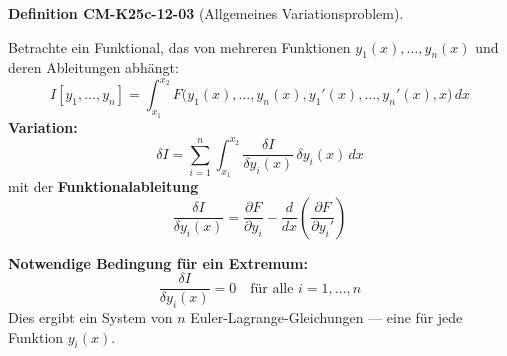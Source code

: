 \documentclass[10pt, letterpaper]{article}
\newcommand{\CustomHeading}[3]{%
  \par\medskip\noindent%
  \textbf{#1 #2} \textnormal{(#3)}.\enskip%
}
\newenvironment{DEF}[2]{\CustomHeading{Definition}{#1}{#2}}{}
\begin{document}
\begin{DEF}{CM-K25c-12-03}{Allgemeines Variationsproblem}
Betrachte ein Funktional, das von mehreren Funktionen \( y_1(x), \dots, y_n(x) \) und deren Ableitungen abhängt:
\[
I[y_1,\dots,y_n] = \int_{x_1}^{x_2} F\big(y_1(x),\dots,y_n(x),y_1'(x),\dots,y_n'(x),x\big)\, dx
\]
\textbf{Variation:}
\[
\delta I = \sum_{i=1}^n \int_{x_1}^{x_2} \frac{\delta I}{\delta y_i(x)}\, \delta y_i(x)\, dx
\]
mit der \textbf{Funktionalableitung}
\[
\frac{\delta I}{\delta y_i(x)} = \frac{\partial F}{\partial y_i} - \frac{d}{dx} \left( \frac{\partial F}{\partial y_i'} \right)
\]

\vspace{0.5em}
\textbf{Notwendige Bedingung für ein Extremum:}
\[
\boxed{
\frac{\delta I}{\delta y_i(x)} = 0 \quad \text{für alle } i = 1,\dots,n
}
\]
Dies ergibt ein System von \( n \) Euler-Lagrange-Gleichungen — eine für jede Funktion \( y_i(x) \).
\end{DEF}
\end{document}
